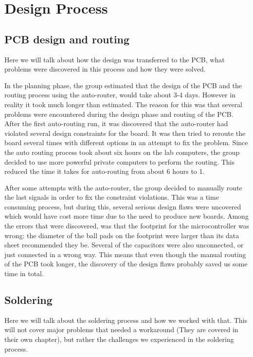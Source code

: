 \section {Design Process}

\subsection{PCB design and routing} \label{pcb:process:ss:pcb_design_and_soldering}

Here we will talk about how the design was transferred to the PCB, what problems were discovered in this process and how they were solved.

In the planning phase, the group estimated that the design of the PCB and the routing process using the auto-router, would take about 3-4 days.
However in reality it took much longer than estimated.
The reason for this was that several problems were encountered during the design phase and routing of the PCB.
After the first auto-routing run, it was discovered that the auto-router had violated several design constraints for the board.
It was then tried to reroute the board several times with different options in an attempt to fix the problem.
Since the auto routing process took about six hours on the lab computers, the group decided to use more powerful private computers to perform the routing.
This reduced the time it takes for auto-routing from about 6 hours to 1.

After some attempts with the auto-router, the group decided to manually route the last signals in order to fix the constraint violations.
This was a time consuming process, but during this, several serious design flaws were uncovered which would have cost more time due to the need to produce new boards.
Among the errors that were discovered, was that the footprint for the microcontroller was wrong: the diameter of the ball pads on the footprint were larger than its data sheet recommended they be.
Several of the capacitors were also unconnected, or just connected in a wrong way.
This means that even though the manual routing of the PCB took longer, the discovery of the design flaws probably saved us some time in total.

\subsection{Soldering} \label{pcb:process:ss:soldering}

Here we will talk about the soldering process and how we worked with that.
This will not cover major problems that needed a workaround (They are covered in their own chapter), but rather the challenges we experienced in the soldering process.

